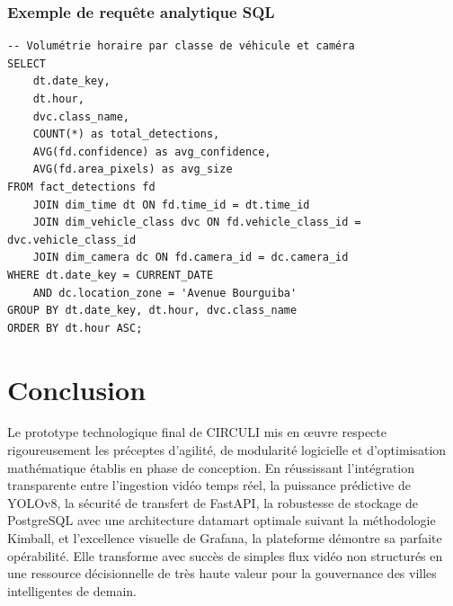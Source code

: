 \subsubsection{Exemple de requête analytique SQL}

\begin{verbatim}
-- Volumétrie horaire par classe de véhicule et caméra
SELECT 
    dt.date_key,
    dt.hour,
    dvc.class_name,
    COUNT(*) as total_detections,
    AVG(fd.confidence) as avg_confidence,
    AVG(fd.area_pixels) as avg_size
FROM fact_detections fd
    JOIN dim_time dt ON fd.time_id = dt.time_id
    JOIN dim_vehicle_class dvc ON fd.vehicle_class_id = dvc.vehicle_class_id
    JOIN dim_camera dc ON fd.camera_id = dc.camera_id
WHERE dt.date_key = CURRENT_DATE
    AND dc.location_zone = 'Avenue Bourguiba'
GROUP BY dt.date_key, dt.hour, dvc.class_name
ORDER BY dt.hour ASC;
\end{verbatim}

\section{Conclusion}
Le prototype technologique final de CIRCULI mis en œuvre respecte rigoureusement les préceptes d'agilité, de modularité logicielle et d'optimisation mathématique établis en phase de conception. En réussissant l'intégration transparente entre l'ingestion vidéo temps réel, la puissance prédictive de YOLOv8, la sécurité de transfert de FastAPI, la robustesse de stockage de PostgreSQL avec une architecture datamart optimale suivant la méthodologie Kimball, et l'excellence visuelle de Grafana, la plateforme démontre sa parfaite opérabilité. Elle transforme avec succès de simples flux vidéo non structurés en une ressource décisionnelle de très haute valeur pour la gouvernance des villes intelligentes de demain.
